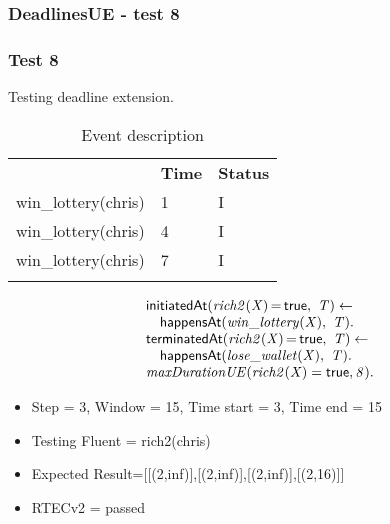 \documentclass[8pt]{beamer}
\DeclareMathOperator{\val}{=}  %
\def \patsize {}
\def\happensAt{\textsf{\patsize happensAt}}
\def\initiatedAt{\textsf{\patsize initiatedAt}}
\def\terminatedAt{\textsf{\patsize terminatedAt}}
\def\true{\textsf{\patsize true}}
\newenvironment{mysplit}%
  {\arraycolsep 0pt \begin{array}{l}}%
  {\end{array}}
\begin{document}
\begin{frame}
    \frametitle{DeadlinesUE - test 8}
    \subsubsection{Test 8}
    \small
    Testing deadline extension.\linebreak
    \begin{minipage}{0.48\linewidth}
        \begin{table}[t!]
            \caption{Event description}
            \begin{center}

                \begin{tabular}{lll}
                    \hline\noalign{\smallskip}
                    \multicolumn{1}{l}{\textbf{Event}} & \multicolumn{1}{c}{\textbf{Time}} & \multicolumn{1}{c}{\textbf{Status}} \\
                    win\_lottery(chris)& 1 & I\\
                    win\_lottery(chris)& 4 & I\\
                    win\_lottery(chris)& 7 & I\\
                    \noalign{\smallskip}
                    \hline
                \end{tabular}
            \end{center}
        \end{table}
    \end{minipage}
    \begin{minipage}{0.48\linewidth}
        \begin{align*}
            \begin{mysplit}
                \initiatedAt\mathit{(rich2(X)\val\true,\ T) \leftarrow}\\
                \quad    \happensAt\mathit{(win\_lottery(X),\ T)}.\\
                \terminatedAt\mathit{(rich2(X)\val\true,\ T) \leftarrow}\\
                \quad    \happensAt\mathit{(lose\_wallet(X),\ T)}.\\
                \mathit{maxDurationUE(rich2(X)=\true,8)}.\\
            \end{mysplit}
        \end{align*}
    \end{minipage}
    \begin{itemize}
        \item Step = 3, Window = 15, Time start = 3, Time end = 15
        \item Testing Fluent = rich2(chris)
        \item Expected Result=[[(2,inf)],[(2,inf)],[(2,inf)],[(2,16)]]
        \item RTECv2 = passed
    \end{itemize}
\end{frame}
\end{document}
